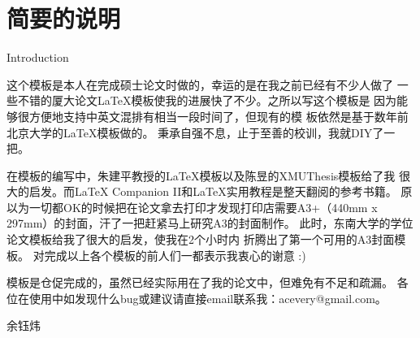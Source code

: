 \chapter{简要的说明}{Introduction}

    这个模板是本人在完成硕士论文时做的，幸运的是在我之前已经有不少人做了
    一些不错的厦大论文\LaTeX{}模板使我的进展快了不少。之所以写这个模板是
    因为\XeLaTeX{}能够很方便地支持中英文混排有相当一段时间了，但现有的模
    板依然是基于数年前北京大学的\LaTeX{}模板做的。
    秉承自强不息，止于至善的校训，我就DIY了一把。

    在模板的编写中，朱建平教授\citep{zhujianpin:2009}的\LaTeX{}模板以及陈昱\citep{chenyu:2005}的XMUThesis模板给了我
    很大的启发。而\LaTeX{} Companion II\citep{latexcompii}和\LaTeX{}实用教程\citep{latexguide}是整天翻阅的参考书籍。
    原以为一切都OK的时候把在论文拿去打印才发现打印店需要A3+（440mm x 297mm）的封面，汗了一把赶紧马上研究A3的封面制作。
    此时，东南大学的学位论文模板\citep{seu:latex}给我了很大的启发，使我在2个小时内
    折腾出了第一个可用的A3封面模板。
    对完成以上各个模板的前人们一都表示我衷心的谢意 :)

    模板是仓促完成的，虽然已经实际用在了我的论文中，但难免有不足和疏漏。
    各位在使用中如发现什么bug或建议请直接email联系我：acevery@gmail.com。

    \hfill 余钰炜
